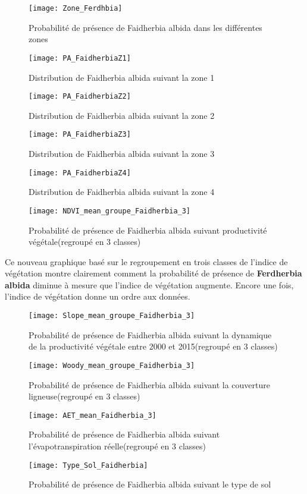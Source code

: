 \documentclass[a4paper, oneside, 12pt]{book}
\begin{document}
\begin{figure}[H]
	\centering
	\caption{Probabilité de présence de Faidherbia albida dans les différentes zones}
	\texttt{[image: Zone\_Ferdhbia]}	
\end{figure}
\begin{figure}[H]
	\centering
	\caption{Distribution de Faidherbia albida suivant la zone 1}
	\texttt{[image: PA\_FaidherbiaZ1]}	
\end{figure}
\begin{figure}[H]
	\centering
	\caption{Distribution de Faidherbia albida suivant la zone 2}
	\texttt{[image: PA\_FaidherbiaZ2]}	
\end{figure}
\begin{figure}[H]
	\centering
	\caption{Distribution de Faidherbia albida suivant la zone 3}
	\texttt{[image: PA\_FaidherbiaZ3]}	
\end{figure}
\begin{figure}[H]
	\centering
	\caption{Distribution de Faidherbia albida suivant la zone 4}
	\texttt{[image: PA\_FaidherbiaZ4]}	
\end{figure}
\begin{figure}[H]
	\centering
	\caption{Probabilité de présence de Faidherbia albida suivant productivité végétale(regroupé en 3 classes)}
	\texttt{[image: NDVI\_mean\_groupe\_Faidherbia\_3]}
\end{figure}
 Ce nouveau graphique basé sur le regroupement en trois classes de l'indice de végétation montre clairement comment la probabilité de présence de \textbf{Ferdherbia albida} diminue  à mesure que l'indice de végétation augmente. Encore une fois, l'indice de végétation donne un ordre aux données.
\begin{figure}[H]
	\centering
	\caption{Probabilité de présence de Faidherbia albida suivant la dynamique de la productivité végétale entre 2000 et 2015(regroupé en 3 classes)}
	\texttt{[image: Slope\_mean\_groupe\_Faidherbia\_3]}
\end{figure}
\begin{figure}[H]
	\centering
	\caption{Probabilité de présence de Faidherbia albida suivant la couverture ligneuse(regroupé en 3 classes)}
	\texttt{[image: Woody\_mean\_groupe\_Faidherbia\_3]}
\end{figure}
\begin{figure}[H]
	\centering
	\caption{Probabilité de présence de Faidherbia albida suivant l’évapotranspiration réelle(regroupé en 3 classes)}
	\texttt{[image: AET\_mean\_Faidherbia\_3]}
\end{figure}
\begin{figure}[H]
	\centering
	\caption{Probabilité de présence de Faidherbia albida suivant le type de sol}
	\texttt{[image: Type\_Sol\_Faidherbia]}
\end{figure}
\end{document}
